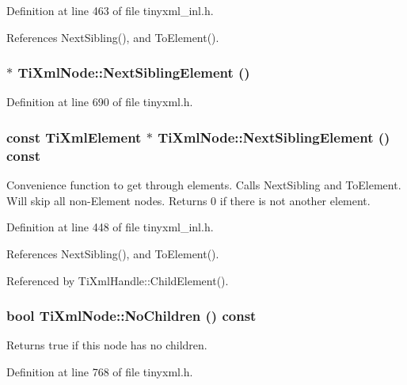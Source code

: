Definition at line 463 of file tinyxml\_\-inl.h.

References NextSibling(), and ToElement().\hypertarget{class_ti_xml_node_a1b211cb5034655a04358e0e2f6fc5010}{
\subsubsection[{NextSiblingElement}]{$\ast$ TiXmlNode::NextSiblingElement ()}}
\label{class_ti_xml_node_a1b211cb5034655a04358e0e2f6fc5010}


Definition at line 690 of file tinyxml.h.\hypertarget{class_ti_xml_node_a7667217e269e0da01d1f82aee94d1a3d}{
\subsubsection[{NextSiblingElement}]{\setlength{\rightskip}{0pt plus 5cm}const {\bf TiXmlElement} $\ast$ TiXmlNode::NextSiblingElement () const}}
\label{class_ti_xml_node_a7667217e269e0da01d1f82aee94d1a3d}
Convenience function to get through elements. Calls NextSibling and ToElement. Will skip all non-\/Element nodes. Returns 0 if there is not another element. 

Definition at line 448 of file tinyxml\_\-inl.h.

References NextSibling(), and ToElement().

Referenced by TiXmlHandle::ChildElement().\hypertarget{class_ti_xml_node_aeed21ad30630ef6e7faf096127edc9f3}{
\subsubsection[{NoChildren}]{\setlength{\rightskip}{0pt plus 5cm}bool TiXmlNode::NoChildren () const}}
\label{class_ti_xml_node_aeed21ad30630ef6e7faf096127edc9f3}


Returns true if this node has no children. 

Definition at line 768 of file tinyxml.h.

